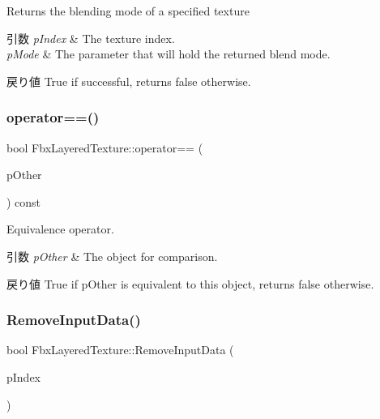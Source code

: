 Returns the blending mode of a specified texture 
\begin{DoxyParams}{引数}
{\em p\+Index} & The texture index. \\
\hline
{\em p\+Mode} & The parameter that will hold the returned blend mode. \\
\hline
\end{DoxyParams}
\begin{DoxyReturn}{戻り値}
{\ttfamily True} if successful, returns {\ttfamily false} otherwise. 
\end{DoxyReturn}
\mbox{\label{class_fbx_layered_texture_a8a01816e03ca531e7bdd8c65804febf7}} 
\subsubsection{\texorpdfstring{operator==()}{operator==()}}
{\footnotesize\ttfamily bool Fbx\+Layered\+Texture\+::operator== (\begin{DoxyParamCaption}\item[{const \hyperlink{class_fbx_layered_texture}{Fbx\+Layered\+Texture} \&}]{p\+Other }\end{DoxyParamCaption}) const}

Equivalence operator. 
\begin{DoxyParams}{引数}
{\em p\+Other} & The object for comparison. \\
\hline
\end{DoxyParams}
\begin{DoxyReturn}{戻り値}
{\ttfamily True} if p\+Other is equivalent to this object, returns {\ttfamily false} otherwise. 
\end{DoxyReturn}
\mbox{\label{class_fbx_layered_texture_a6d1190feade206649f73444c5b114bd1}} 
\subsubsection{\texorpdfstring{Remove\+Input\+Data()}{RemoveInputData()}}
{\footnotesize\ttfamily bool Fbx\+Layered\+Texture\+::\+Remove\+Input\+Data (\begin{DoxyParamCaption}\item[{int}]{p\+Index }\end{DoxyParamCaption})\hspace{0.3cm}{\ttfamily [protected]}}

